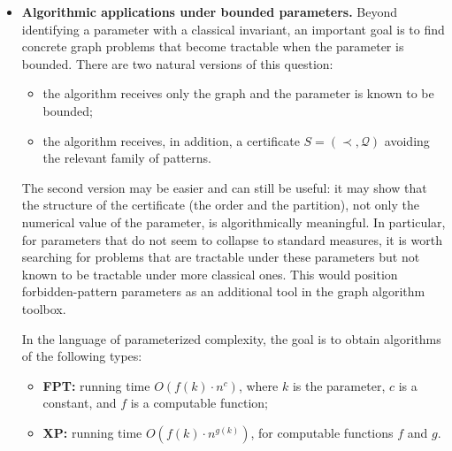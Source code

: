 \documentclass[11pt]{article}
\theoremstyle{definition}
\theoremstyle{plain}
\theoremstyle{remark}
\begin{document}
\begin{itemize}
\item \textbf{Algorithmic applications under bounded parameters.}
  Beyond identifying a parameter with a classical invariant, an important goal is to find concrete graph problems
  that become tractable when the parameter is bounded. There are two natural versions of this question:
  \begin{itemize}
  \item the algorithm receives only the graph and the parameter is known to be bounded;
  \item the algorithm receives, in addition, a certificate \(S=(\prec,\mathcal Q)\) avoiding the relevant family of patterns.
  \end{itemize}

  The second version may be easier and can still be useful: it may show that the structure of the certificate
  (the order and the partition), not only the numerical value of the parameter, is algorithmically meaningful.
  In particular, for parameters that do not seem to collapse to standard measures, it is worth searching for problems
  that are tractable under these parameters but not known to be tractable under more classical ones. This would position
  forbidden-pattern parameters as an additional tool in the graph algorithm toolbox.

  In the language of parameterized complexity, the goal is to obtain algorithms of the following types:
  \begin{itemize}
  \item \textbf{FPT:} running time \(O(f(k)\cdot n^c)\), where \(k\) is the parameter, \(c\) is a constant, and \(f\)
  is a computable function;
  \item \textbf{XP:} running time \(O(f(k)\cdot n^{g(k)})\), for computable functions \(f\) and \(g\).
  \end{itemize}
\end{itemize}


\printbibliography
\end{document}
